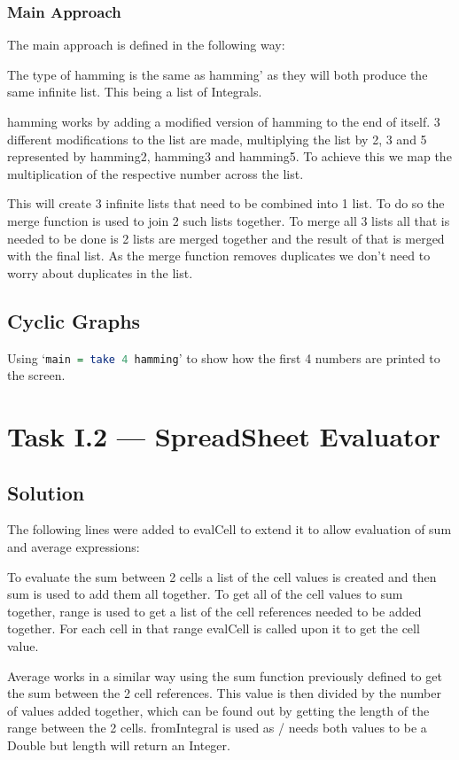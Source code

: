 \documentclass[a4paper]{article}
\begin{document}
\subsubsection{Main Approach}
The main approach is defined in the following way:

\par
The type of hamming is the same as hamming' as they will both produce the same infinite list.
This being a list of Integrals.
\par
hamming works by adding a modified version of hamming to the end of itself.
3 different modifications to the list are made, multiplying the list by 2, 3 and 5 represented by hamming2, hamming3 and hamming5.
To achieve this we map the multiplication of the respective number across the list.
\par
This will create 3 infinite lists that need to be combined into 1 list.
To do so the merge function is used to join 2 such lists together.
To merge all 3 lists all that is needed to be done is 2 lists are merged together and the result of that is merged with the final list.
As the merge function removes duplicates we don't need to worry about duplicates in the list.

\subsection{Cyclic Graphs}
Using `\lstinline[language = haskell]{main = take 4 hamming}' to show how the first 4 numbers are printed to the screen.

\section{Task I.2 --- SpreadSheet Evaluator}
\subsection{Solution}
The following lines were added to evalCell to extend it to allow evaluation of sum and average expressions:

\par
To evaluate the sum between 2 cells a list of the cell values is created and then sum is used to add them all together.
To get all of the cell values to sum together, range is used to get a list of the cell references needed to be added together.
For each cell in that range evalCell is called upon it to get the cell value.
\medskip
\par
Average works in a similar way using the sum function previously defined to get the sum between the 2 cell references.
This value is then divided by the number of values added together, which can be found out by getting the length of the range between the 2 cells.
fromIntegral is used as / needs both values to be a Double but length will return an Integer.
\end{document}
